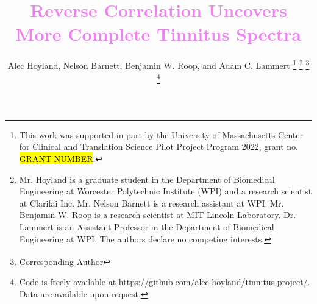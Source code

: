 \documentclass[journal]{IEEEtran}
\begin{document}
%
\title{\textcolor{violet}{Reverse Correlation Uncovers More Complete Tinnitus Spectra \vspace{0.25cm}}}

%
%
%

\author{Alec Hoyland, Nelson Barnett, Benjamin W. Roop, and Adam C. Lammert\textsuperscript{\textdagger{}}%
\thanks{This work was supported in part by the University of Massachusetts
Center for Clinical and Translation Science Pilot Project Program 2022,
grant no. \hl{GRANT NUMBER}.}%
\thanks{Mr. Hoyland is a graduate student in the Department of Biomedical Engineering
at Worcester Polytechnic Institute (WPI) and a research scientist at Clarifai Inc.
Mr. Nelson Barnett is a research assistant at WPI.
Mr. Benjamin W. Roop is a research scientist at MIT Lincoln Laboratory.
Dr. Lammert is an Assistant Professor in the Department of Biomedical Engineering at WPI.
The authors declare no competing interests.}%
\thanks{\textsuperscript{\textdagger{}} Corresponding Author}%
\thanks{Code is freely available at \protect\url{https://github.com/alec-hoyland/tinnitus-project/}.
Data are available upon request.}}
\end{document}
